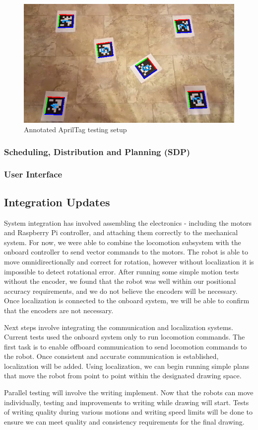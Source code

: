 \begin{figure}[h!]
\centering
\includegraphics[width=0.49\columnwidth]{figs/apriltag_test_annotated.png}
\caption{Annotated AprilTag testing setup}
\label{fig:localization_sample}
\end{figure}

\subsubsection{Scheduling, Distribution and Planning (SDP)}

\subsubsection{User Interface}


\subsection{Integration Updates}
\label{sec:integration_progress}
System integration has involved assembling the electronics - including the motors and Raspberry Pi controller, and attaching them correctly to the mechanical system. For now, we were able to combine the locomotion subsystem with the onboard controller to send vector commands to the motors. The robot is able to move omnidirectionally and correct for rotation, however without localization it is impossible to detect rotational error. After running some simple motion tests without the encoder, we found that the robot was well within our positional accuracy requirements, and we do not believe the encoders will be necessary. Once localization is connected to the onboard system, we will be able to confirm that the encoders are not necessary.

Next steps involve integrating the communication and localization systems. Current tests used the onboard system only to run locomotion commands. The first task is to enable offboard communication to send locomotion commands to the robot. Once consistent and accurate communication is established, localization will be added. Using localization, we can begin running simple plans that move the robot from point to point within the designated drawing space.

Parallel testing will involve the writing implement. Now that the robots can move individually, testing and improvements to writing while drawing will start. Tests of writing quality during various motions and writing speed limits will be done to ensure we can meet quality and consistency requirements for the final drawing.


\clearpage
